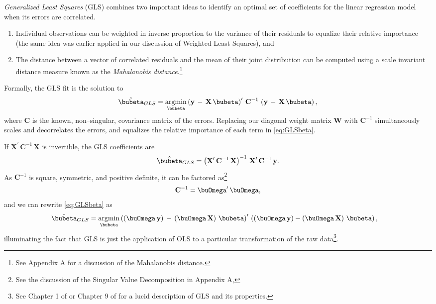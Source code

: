 \documentclass[graybox,envcountchap,sectrefs]{svmono}\usepackage[]{graphicx}\usepackage[]{xcolor}
\begin{document}
\begin{appendices}
\emph{Generalized Least Squares} (GLS) combines two important ideas
to identify an optimal set of coefficients for the linear regression
model when its errors are correlated.
\begin{enumerate}
\item Individual observations can be weighted in inverse proportion to the
variance of their residuals to equalize their relative importance
(the same idea was earlier applied in our discussion of Weighted Least
Squares), and
\item The distance between a vector of correlated residuals and the mean
of their joint distribution can be computed using a scale invariant
distance measure known as the \emph{Mahalanobis distance}.\footnote{See Appendix A for a discussion of the Mahalanobis distance.}
\end{enumerate}
Formally, the GLS fit is the solution to
\begin{equation}
\hat{\bubeta}_{GLS}=\underset{\bubeta}{\mathrm{argmin}}\left(\mathrm{\mathbf{y}}\,-\,\mathrm{\mathbf{X}}\,\bubeta\right)^{\prime}\,\mathrm{\mathbf{C}^{-1}}\,\left(\mathrm{\mathbf{y}}\,-\,\mathrm{\mathbf{X}}\,\bubeta\right),\label{eq:GLSbeta}
\end{equation}
where $\mathbf{C}$ is the known, non--singular, covariance matrix
of the errors. Replacing our diagonal weight matrix $\mathrm{\mathbf{W}}$
with $\mathbf{C}^{-1}$ simultaneously scales and decorrelates the
errors, and equalizes the relative importance of each term in \eqref{eq:GLSbeta}.

If $\mathrm{\mathbf{X}}^{\prime}\,\mathrm{\mathbf{C}^{-1}}\,\mathrm{\mathbf{X}}$
is invertible, the GLS coefficients are
\begin{equation}
\hat{\bubeta}_{GLS}=\left(\mathrm{\mathbf{X}}^{\prime}\,\mathrm{\mathbf{C}^{-1}\,}\mathrm{\mathbf{X}}\right)^{-1}\,\mathrm{\mathbf{X}}^{\prime}\,\mathbf{C}^{-1}\,\mathrm{\mathbf{y}}.\label{eq:GLSbeta1}
\end{equation}
As $\mathbf{C}^{-1}$ is square, symmetric, and positive definite,
it can be factored as\footnote{See the discussion of the Singular Value Decomposition in Appendix
A,}
\begin{equation}
\mathbf{C}^{-1}=\buOmega^{\prime}\,\buOmega,\label{eq:CinverseDecomposition}
\end{equation}
and we can rewrite \eqref{eq:GLSbeta} as
\begin{align}
\hat{\bubeta}_{GLS} & =\underset{\bubeta}{\mathrm{argmin}}\left(\left(\mathbf{\buOmega\,}\mathrm{\mathbf{y}}\right)\,-\,\left(\mathbf{\buOmega\,}\mathrm{\mathbf{X}}\right)\,\bubeta\right)^{\prime}\,\left(\left(\mathbf{\buOmega}\,\mathrm{\mathbf{y}}\right)-\left(\mathbf{\buOmega}\,\mathrm{\mathbf{X}}\right)\,\bubeta\right),\label{eq:GLSBeta2}
\end{align}
illuminating the fact that GLS is just the application of OLS to a
particular transformation of the raw data\footnote{See Chapter 1 of \citet{Hayashi2000} or Chapter 9 of \citet{Greene2018}
for a lucid description of GLS and its properties.}.


\end{appendices}
\end{document}
